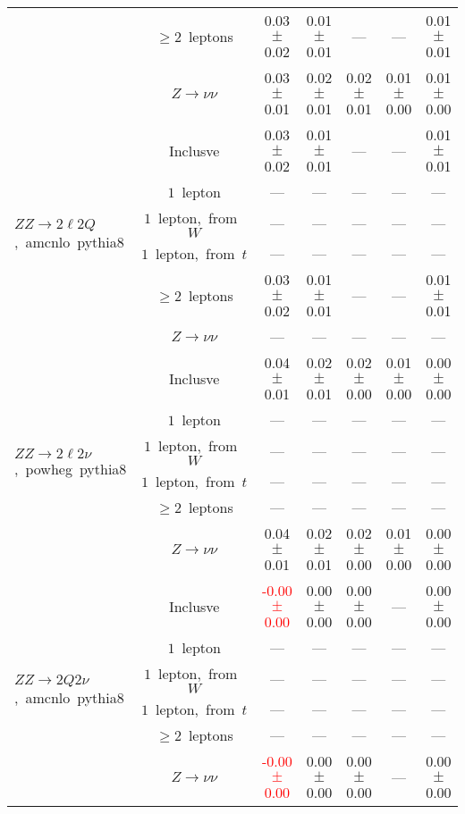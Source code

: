 \documentclass{article}
\begin{document}
\begin{longtable}{|l|c|c|c|c|c|c|}
 & $\ge2$~leptons  & 0.03 $\pm$ 0.02  & 0.01 $\pm$ 0.01  & ---  & ---  & 0.01 $\pm$ 0.01 \\* 
 & $Z\rightarrow\nu\nu$  & 0.03 $\pm$ 0.01  & 0.02 $\pm$ 0.01  & 0.02 $\pm$ 0.01  & 0.01 $\pm$ 0.00  & 0.01 $\pm$ 0.00 \\* 
\hline 
\multirow{6}{*}{$ZZ{\rightarrow}2{\ell}2Q$,~amcnlo~pythia8} & Inclusve  & 0.03 $\pm$ 0.02  & 0.01 $\pm$ 0.01  & ---  & ---  & 0.01 $\pm$ 0.01 \\* 
 & $1$~lepton  & ---  & ---  & ---  & ---  & --- \\* 
 & $1$~lepton,~from~$W$  & ---  & ---  & ---  & ---  & --- \\* 
 & $1$~lepton,~from~$t$  & ---  & ---  & ---  & ---  & --- \\* 
 & $\ge2$~leptons  & 0.03 $\pm$ 0.02  & 0.01 $\pm$ 0.01  & ---  & ---  & 0.01 $\pm$ 0.01 \\* 
 & $Z\rightarrow\nu\nu$  & ---  & ---  & ---  & ---  & --- \\* 
\hline 
\multirow{6}{*}{$ZZ{\rightarrow}2{\ell}2{\nu}$,~powheg~pythia8} & Inclusve  & 0.04 $\pm$ 0.01  & 0.02 $\pm$ 0.01  & 0.02 $\pm$ 0.00  & 0.01 $\pm$ 0.00  & 0.00 $\pm$ 0.00 \\* 
 & $1$~lepton  & ---  & ---  & ---  & ---  & --- \\* 
 & $1$~lepton,~from~$W$  & ---  & ---  & ---  & ---  & --- \\* 
 & $1$~lepton,~from~$t$  & ---  & ---  & ---  & ---  & --- \\* 
 & $\ge2$~leptons  & ---  & ---  & ---  & ---  & --- \\* 
 & $Z\rightarrow\nu\nu$  & 0.04 $\pm$ 0.01  & 0.02 $\pm$ 0.01  & 0.02 $\pm$ 0.00  & 0.01 $\pm$ 0.00  & 0.00 $\pm$ 0.00 \\* 
\hline 
\multirow{6}{*}{$ZZ{\rightarrow}2Q2{\nu}$,~amcnlo~pythia8} & Inclusve  & \textcolor{red}{ -0.00 $\pm$ 0.00 }  & 0.00 $\pm$ 0.00  & 0.00 $\pm$ 0.00  & ---  & 0.00 $\pm$ 0.00 \\* 
 & $1$~lepton  & ---  & ---  & ---  & ---  & --- \\* 
 & $1$~lepton,~from~$W$  & ---  & ---  & ---  & ---  & --- \\* 
 & $1$~lepton,~from~$t$  & ---  & ---  & ---  & ---  & --- \\* 
 & $\ge2$~leptons  & ---  & ---  & ---  & ---  & --- \\* 
 & $Z\rightarrow\nu\nu$  & \textcolor{red}{ -0.00 $\pm$ 0.00 }  & 0.00 $\pm$ 0.00  & 0.00 $\pm$ 0.00  & ---  & 0.00 $\pm$ 0.00 \\* 

\end{longtable}
\end{document}
